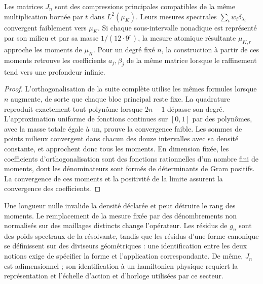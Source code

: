 \begin{proposition}
\label{prop:jacobi-refinement}
Les matrices \(J_n\) sont des compressions principales compatibles de la
même multiplication bornée par \(t\) dans \(L^2(\mu_K)\). Leurs
mesures spectrales \(\sum_iw_i\delta_{\lambda_i}\) convergent
faiblement vers \(\mu_K\). Si chaque sous-intervalle nonadique est représenté
par son milieu et par sa masse \(1/(12\cdot9^r)\), la mesure
atomique résultante \(\mu_{K,r}\) approche les moments de
\(\mu_K\). Pour un degré fixé \(n\), la construction à partir de ces
moments retrouve les coefficients \(a_j,\beta_j\) de la même
matrice lorsque le raffinement tend vers une profondeur infinie.
\end{proposition}
\begin{proof}
L'orthogonalisation de la suite complète utilise les mêmes formules lorsque \(n\) augmente, de sorte que chaque bloc principal reste fixe. La quadrature reproduit exactement tout polynôme lorsque \(2n-1\) dépasse son degré. L'approximation uniforme de fonctions continues sur \([0,1]\) par des polynômes, avec la masse totale égale à un, prouve la convergence faible. Les sommes de points milieux convergent dans chacun des douze intervalles avec sa densité constante, et approchent donc tous les moments. En dimension fixée, les coefficients d'orthogonalisation sont des fonctions rationnelles d'un nombre fini de moments, dont les dénominateurs sont formés de déterminants de Gram positifs. La convergence de ces moments et la positivité de la limite assurent la convergence des coefficients.
\end{proof}

\begin{falsifier}
Une longueur nulle invalide la densité déclarée et peut détruire le
rang des moments. Le remplacement de la mesure fixée par des dénombrements
non normalisés sur des maillages distincts change l’opérateur. Les résidus
de \(g_n\) sont des poids spectraux de la résolvante, tandis que les résidus
d’une forme canonique se définissent sur des diviseurs géométriques : une
identification entre les deux notions exige de spécifier la forme et
l’application correspondante. De même, \(J_n\) est adimensionnel ; son
identification à un hamiltonien physique requiert la représentation
et l’échelle d’action et d’horloge utilisées par ce secteur.
\end{falsifier}


